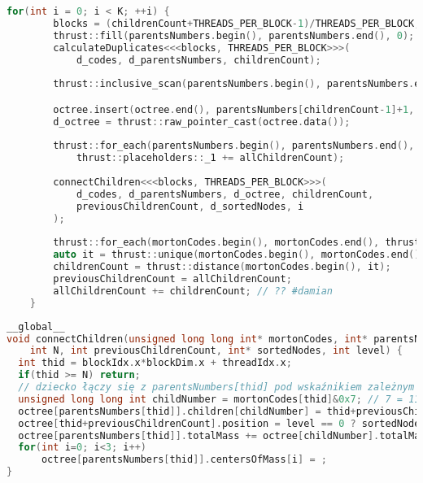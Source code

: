 \documentclass[14pt,twoside,a4paper]{article}
\theoremstyle{definition}
\begin{document}
\begin{lstlisting}[language=C++, frame=single, framerule=2pt, caption=Kroki 5-6]
for(int i = 0; i < K; ++i) {
        blocks = (childrenCount+THREADS_PER_BLOCK-1)/THREADS_PER_BLOCK;
        thrust::fill(parentsNumbers.begin(), parentsNumbers.end(), 0);
        calculateDuplicates<<<blocks, THREADS_PER_BLOCK>>>(
            d_codes, d_parentsNumbers, childrenCount);
        
        thrust::inclusive_scan(parentsNumbers.begin(), parentsNumbers.end(), parentsNumbers.begin());

        octree.insert(octree.end(), parentsNumbers[childrenCount-1]+1, OctreeNode());
        d_octree = thrust::raw_pointer_cast(octree.data()); 
        
        thrust::for_each(parentsNumbers.begin(), parentsNumbers.end(), 
        	thrust::placeholders::_1 += allChildrenCount);
        
        connectChildren<<<blocks, THREADS_PER_BLOCK>>>(
            d_codes, d_parentsNumbers, d_octree, childrenCount, 
            previousChildrenCount, d_sortedNodes, i
        );
        
        thrust::for_each(mortonCodes.begin(), mortonCodes.end(), thrust::placeholders::_1 >>= 3);
        auto it = thrust::unique(mortonCodes.begin(), mortonCodes.end());
        childrenCount = thrust::distance(mortonCodes.begin(), it);
        previousChildrenCount = allChildrenCount;
        allChildrenCount += childrenCount; // ?? #damian
    }
\end{lstlisting}



\begin{lstlisting}[language=C++, frame=single, framerule=2pt, caption=Kernel connectChildren]
__global__
void connectChildren(unsigned long long int* mortonCodes, int* parentsNumbers, OctreeNode* octree, 
    int N, int previousChildrenCount, int* sortedNodes, int level) {
  int thid = blockIdx.x*blockDim.x + threadIdx.x;
  if(thid >= N) return;
  // dziecko łączy się z parentsNumbers[thid] pod wskaźnikiem zależnym od bitów
  unsigned long long int childNumber = mortonCodes[thid]&0x7; // 7 = 111 binarnie
  octree[parentsNumbers[thid]].children[childNumber] = thid+previousChildrenCount;
  octree[thid+previousChildrenCount].position = level == 0 ? sortedNodes[thid] : -1;
  octree[parentsNumbers[thid]].totalMass += octree[childNumber].totalMass;
  for(int i=0; i<3; i++) 
      octree[parentsNumbers[thid]].centersOfMass[i] = ;
}
\end{lstlisting}
\end{document}
